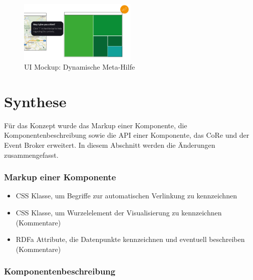 \documentclass[
	headsepline,
	footsepline,
	fontsize=12pt,
	bibliography=totoc
]{scrbook}
\begin{document}
\begin{figure}[htbp]
   \centering
   \includegraphics[width=0.5\textwidth]{images/konzeption-meta-dyn.png}
   \caption{UI Mockup: Dynamische Meta-Hilfe}
   \label{figure:meta-dyn}
\end{figure}

\section{Synthese}
\label{section:konzeption:synthese}

Für das Konzept wurde das Markup einer Komponente, die Komponentenbeschreibung sowie die API einer Komponente, das CoRe und der Event Broker erweitert. In diesem Abschnitt werden die Änderungen zusammengefasst.

\subsubsection{Markup einer Komponente}

\begin{itemize}
	\item CSS Klasse, um Begriffe zur automatischen Verlinkung zu kennzeichnen
	\item CSS Klasse, um Wurzelelement der Visualisierung zu kennzeichnen (Kommentare)
	\item RDFa Attribute, die Datenpunkte kennzeichnen und eventuell beschreiben (Kommentare)
\end{itemize}

\subsubsection{Komponentenbeschreibung}
\end{document}
